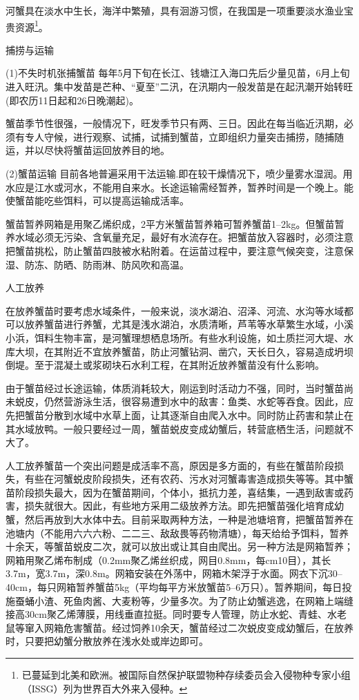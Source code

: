 \documentclass{ctexbook}
\begin{document}
河蟹具在淡水中生长，海洋中繁殖，具有洄游习惯，在我国是一项重要淡水渔业宝贵资源\footnote{已蔓延到北美和欧洲。被国际自然保护联盟物种存续委员会入侵物种专家小组（ISSG）列为世界百大外来入侵种。}。

捕捞与运输

(1)不失时机张捕蟹苗 每年5月下旬在长江、钱塘江入海口先后少量见苗，6月上旬进入旺汛。集中发苗是芒种、“夏至”二汛，在汛期内一般发苗是在起汛潮开始转旺(即农历11日起和26日晚潮起)。

蟹苗季节性很强，一般情况下，旺发季节只有两、三日。因此在每当临近汛期，必须有专人守候，进行观察、试捕，试捕到蟹苗，立即组织力量突击捕捞，随捕随运，并以尽快将蟹苗运回放养目的地。

(2)蟹苗运输 目前各地普遍采用干法运输.即在较干燥情况下，喷少量雾水湿润。用水应是江水或河水，不能用自来水。长途运输需经暂养，暂养时间是一个晚上。能使蟹苗能吃些饵料，可以提高运输成活率。

蟹苗暂养网箱是用聚乙烯织成，2平方米蟹苗暂养箱可暂养蟹苗1--2kg。但蟹苗暂养水域必须无污染、含氧量充足，最好有水流存在。把蟹苗放入容器时，必须注意把蟹苗挑松，防止蟹苗四肢被水粘附着。在运苗过程中，要注意气候突变，注意保湿、防冻、防晒、防雨淋、防风吹和高温。

人工放养

在放养蟹苗时要考虑水域条件，一般来说，淡水湖泊、沼泽、河流、水沟等水域都可以放养蟹苗进行养蟹，尤其是浅水湖泊，水质清晰，芦苇等水草繁生水域，小溪小浜，饵料生物丰富，是河蟹理想栖息场所。有些水利设施，如土质拦河大堤、水库大坝，在其附近不宜放养蟹苗，防止河蟹钻洞、凿穴，天长日久，容易造成坍坝倒堤。至于混凝土或浆砌块石水利工程，在其附近放养蟹苗没有什么影响。

由于蟹苗经过长途运输，体质消耗较大，刚运到时活动力不强，同时，当时蟹苗尚未蜕皮，仍然营游泳生活，很容易遭到水中的敌害：鱼类、水蛇等吞食。因此，应先把蟹苗分散到水域中水草上面，让其逐渐自由爬入水中。同时防止药害和禁止在其水域放鸭。一般只要经过一周，蟹苗蜕皮变成幼蟹后，转营底栖生活，问题就不大了。

人工放养蟹苗一个突出问题是成活率不高，原因是多方面的，有些在蟹苗阶段损失，有些在河蟹蜕皮阶段损失，还有农药、污水对河蟹毒害造成损失等等。其中蟹苗阶段损失最大，因为在蟹苗期间，个体小，抵抗力差，喜结集，一遇到敌害或药害，损失就很大。因此，有些地方采用二级放养方法。即先把蟹苗强化培育成幼蟹，然后再放到大水体中去。目前采取两种方法，一种是池塘培育，把蟹苗暂养在池塘内（不能用六六六粉、二二三、敌敌畏等药物清塘），每天给给予饵料，暂养十余天，等蟹苗蜕皮二次，就可以放出或让其自由爬出。另一种方法是网箱暂养；网箱用聚乙烯布制成（0.2mm聚乙烯丝织成，网目0.8mm，每cm10目），其长3.7m，宽3.7m，深0.8m。网箱安装在外荡中，网箱木架浮于水面。网衣下沉30--40cm，每只网箱暂养蟹苗5kg（平均每平方米放蟹苗5--6万只）。暂养期间，每日投施蚕蛹小渣、死鱼肉酱、大麦粉等，少量多次。为了防止幼蟹逃逸，在网箱上端缝接高30cm聚乙烯薄膜，用线垂直拉挺。同时要专人管理，防止水蛇、青蛙、水老鼠等窜入网箱危害蟹苗。经过饲养10余天，蟹苗经过二次蜕皮变成幼蟹后，在放养时，只要把幼蟹分散放养在浅水处或岸边即可。
\end{document}
